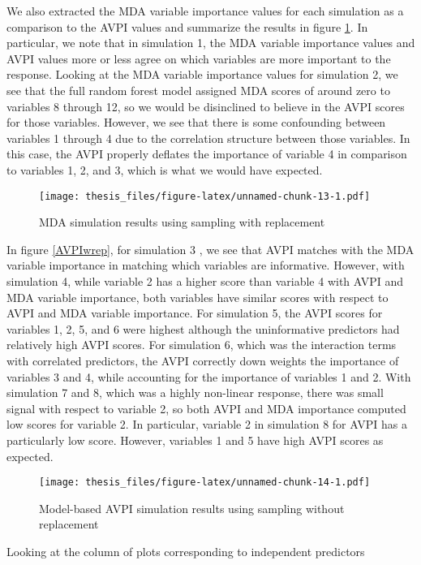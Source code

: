 \documentclass[12pt,twoside]{reedthesis}
\theoremstyle{definition}
\theoremstyle{definition}
\theoremstyle{definition}
\theoremstyle{remark}
\begin{document}
We also extracted the MDA variable importance values for each simulation
as a comparison to the AVPI values and summarize the results in figure
\ref{MDAwrep}. In particular, we note that in simulation 1, the MDA
variable importance values and AVPI values more or less agree on which
variables are more important to the response. Looking at the MDA
variable importance values for simulation 2, we see that the full random
forest model assigned MDA scores of around zero to variables 8 through
12, so we would be disinclined to believe in the AVPI scores for those
variables. However, we see that there is some confounding between
variables 1 through 4 due to the correlation structure between those
variables. In this case, the AVPI properly deflates the importance of
variable 4 in comparison to variables 1, 2, and 3, which is what we
would have expected. \par
\begin{figure}
\centering
\texttt{[image: thesis\_files/figure-latex/unnamed-chunk-13-1.pdf]}
\caption{\label{fig:unnamed-chunk-13}\label{MDAwrep}MDA simulation results
using sampling with replacement}
\end{figure}
In figure \ref{AVPIwrep}, for simulation 3 , we see that AVPI matches
with the MDA variable importance in matching which variables are
informative. However, with simulation 4, while variable 2 has a higher
score than variable 4 with AVPI and MDA variable importance, both
variables have similar scores with respect to AVPI and MDA variable
importance. For simulation 5, the AVPI scores for variables 1, 2, 5, and
6 were highest although the uninformative predictors had relatively high
AVPI scores. For simulation 6, which was the interaction terms with
correlated predictors, the AVPI correctly down weights the importance of
variables 3 and 4, while accounting for the importance of variables 1
and 2. With simulation 7 and 8, which was a highly non-linear response,
there was small signal with respect to variable 2, so both AVPI and MDA
importance computed low scores for variable 2. In particular, variable 2
in simulation 8 for AVPI has a particularly low score. However,
variables 1 and 5 have high AVPI scores as expected. \par 
\begin{figure}
\centering
\texttt{[image: thesis\_files/figure-latex/unnamed-chunk-14-1.pdf]}
\caption{\label{fig:unnamed-chunk-14}\label{AVPIworep}Model-based AVPI
simulation results using sampling without replacement}
\end{figure}
Looking at the column of plots corresponding to independent predictors
\end{document}
